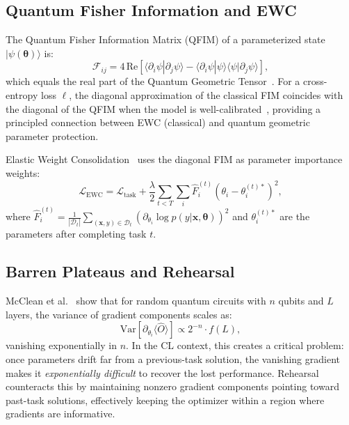 \documentclass[a4paper,nopdfoutputerror]{quantumarticle}
\begin{document}
\subsection{Quantum Fisher Information and EWC}

The Quantum Fisher Information Matrix (QFIM) of a parameterized state
$|\psi(\boldsymbol\theta)\rangle$ is:
\begin{equation}
  \mathcal{F}_{ij} = 4\,\mathrm{Re}\!\left[
    \langle\partial_i\psi|\partial_j\psi\rangle -
    \langle\partial_i\psi|\psi\rangle\langle\psi|\partial_j\psi\rangle
  \right],
  \label{eq:qfim}
\end{equation}
which equals the real part of the Quantum Geometric Tensor~\cite{haug2021}.
For a cross-entropy loss $\ell$, the diagonal approximation of the
classical FIM coincides with the diagonal of the QFIM when the model is
well-calibrated~\cite{schuld2021effect}, providing a principled connection
between EWC (classical) and quantum geometric parameter protection.

Elastic Weight Consolidation~\cite{kirkpatrick2017overcoming} uses the
diagonal FIM as parameter importance weights:
\begin{equation}
  \mathcal{L}_\mathrm{EWC} = \mathcal{L}_\mathrm{task} +
  \frac{\lambda}{2}\sum_{t<T}\sum_i
  \hat{F}_i^{(t)}\!\left(\theta_i - \theta_i^{(t)*}\right)^{\!2},
  \label{eq:ewc}
\end{equation}
where $\hat{F}_i^{(t)} = \frac{1}{|\mathcal{D}_t|}\sum_{(\mathbf{x},y)\in\mathcal{D}_t}
(\partial_{\theta_i}\log p(y|\mathbf{x},\boldsymbol\theta))^2$
and $\theta_i^{(t)*}$ are the parameters after completing task $t$.

\subsection{Barren Plateaus and Rehearsal}

McClean et al.~\cite{mcclean2018barren} show that for random quantum circuits
with $n$ qubits and $L$ layers, the variance of gradient components scales as:
\begin{equation}
  \mathrm{Var}\!\left[\partial_{\theta_i}\langle\hat{O}\rangle\right]
  \propto 2^{-n} \cdot f(L),
  \label{eq:barren}
\end{equation}
vanishing exponentially in $n$.
In the CL context, this creates a critical problem: once parameters drift
far from a previous-task solution, the vanishing gradient makes it
\emph{exponentially difficult} to recover the lost performance.
Rehearsal counteracts this by maintaining nonzero gradient components
pointing toward past-task solutions, effectively keeping the optimizer
within a region where gradients are informative.
\end{document}
